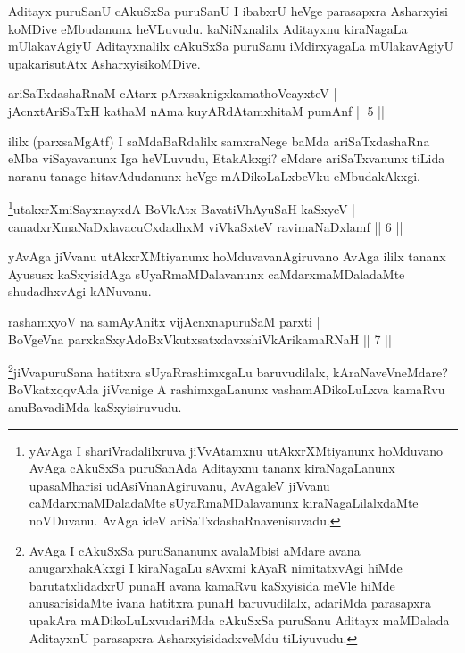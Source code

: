 \begin{artha}
Aditayx puruSanU cAkuSxSa puruSanU I ibabxrU heVge parasapxra Asharxyisi koMDive eMbudanunx heVLuvudu. kaNiNxnalilx Aditayxnu kiraNagaLa mUlakavAgiyU Aditayxnalilx cAkuSxSa puruSanu iMdirxyagaLa mUlakavAgiyU upakarisutAtx AsharxyisikoMDive.
\end{artha}

\begin{shl}
ariSaTxdashaRnaM cAtarx pArxsaknigxkamathoVcayxteV | \\
jAcnxtAriSaTxH kathaM nAma kuyARdAtamxhitaM pumAnf \hfill ||  5 || 
\end{shl}

\begin{artha}
ililx (parxsaMgAtf) I saMdaBaRdalilx samxraNege baMda ariSaTxdashaRna eMba viSayavanunx Iga heVLuvudu, EtakAkxgi? eMdare ariSaTxvanunx tiLida naranu tanage hitavAdudanunx heVge mADikoLaLxbeVku eMbudakAkxgi.
\end{artha}

\begin{shl}
\footnote{yAvAga I shariVradalilxruva jiVvAtamxnu utAkxrXMtiyanunx hoMduvano AvAga cAkuSxSa puruSanAda Aditayxnu tananx kiraNagaLanunx upasaMharisi udAsiVnanAgiruvanu, AvAgaleV jiVvanu caMdarxmaMDaladaMte sUyaRmaMDalavanunx kiraNagaLilalxdaMte noVDuvanu. AvAga ideV ariSaTxdashaRnavenisuvadu.}utakxrXmiSayxnayxdA BoVkAtx BavatiVhA\s \s yuSaH kaSxyeV | \\
canadxrXmaNaDxlavacuCxdadhxM viVkaSxteV ravimaNaDxlamf \hfill ||  6 || 
\end{shl}

\begin{artha}
yAvAga jiVvanu utAkxrXMtiyanunx hoMduvavanAgiruvano AvAga ililx tananx Ayususx kaSxyisidAga sUyaRmaMDalavanunx caMdarxmaMDaladaMte shudadhxvAgi kANuvanu.
\end{artha}


\begin{shl}
rashamxyoV na samAyAnitx vijAcnxnapuruSaM parxti | \\
BoVgeVna parxkaSxyAdoBxVkutxsatxdavxshiVkArikamaRNaH \hfill ||  7 || 
\end{shl}

\begin{artha}
\footnote{AvAga I cAkuSxSa puruSananunx avalaMbisi aMdare avana anugarxhakAkxgi I kiraNagaLu sAvxmi kAyaR nimitatxvAgi hiMde barutatxlidadxrU punaH avana kamaRvu kaSxyisida meVle hiMde anusarisidaMte ivana hatitxra punaH baruvudilalx, adariMda parasapxra upakAra mADikoLuLxvudariMda cAkuSxSa puruSanu Aditayx maMDalada AditayxnU parasapxra AsharxyisidadxveMdu tiLiyuvudu.}jiVvapuruSana hatitxra sUyaRrashimxgaLu baruvudilalx, kAraNaveVneMdare? BoVkatxqqvAda jiVvanige A rashimxgaLanunx vashamADikoLuLxva kamaRvu anuBavadiMda kaSxyisiruvudu.
\end{artha}

